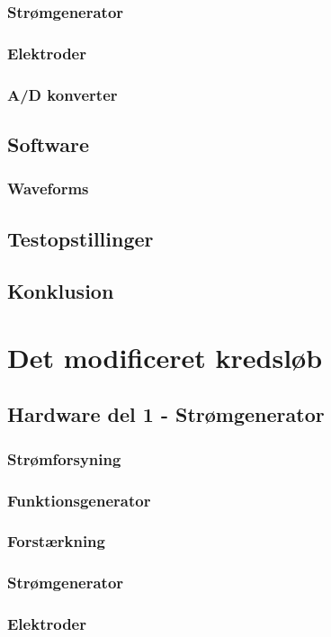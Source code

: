 \documentclass[main.tex]{subfiles}
\begin{document}
\subsection{Strømgenerator}
\subsection{Elektroder}
\subsection{A/D konverter}
\section{Software}
\subsection{Waveforms}

\section{Testopstillinger}
\section{Konklusion}

\chapter{Det modificeret kredsløb}
\section{Hardware del 1 - Strømgenerator}
\subsection{Strømforsyning}
\subsection{Funktionsgenerator}
\subsection{Forstærkning}
\subsection{Strømgenerator}
\subsection{Elektroder}
\end{document}
